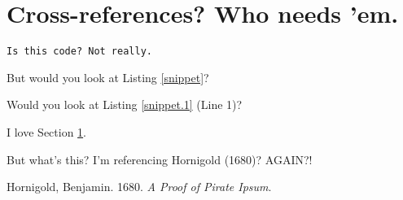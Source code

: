\section{Cross-references? Who needs 'em.}\label{me}

\hypertarget{snippet}{%
\label{snippet}}%
\begin{verbatim}
Is this code? Not really.
\end{verbatim}

But would you look at Listing \ref{snippet}?

Would you look at Listing \ref{snippet.1} (Line 1)?

I love Section \ref{me}.

But what's this? I'm referencing Hornigold (1680)? AGAIN?!

\hypertarget{refs}{}
\begin{CSLReferences}{1}{0}
\leavevmode{}%
Hornigold, Benjamin. 1680. \emph{A Proof of Pirate Ipsum}.

\end{CSLReferences}
